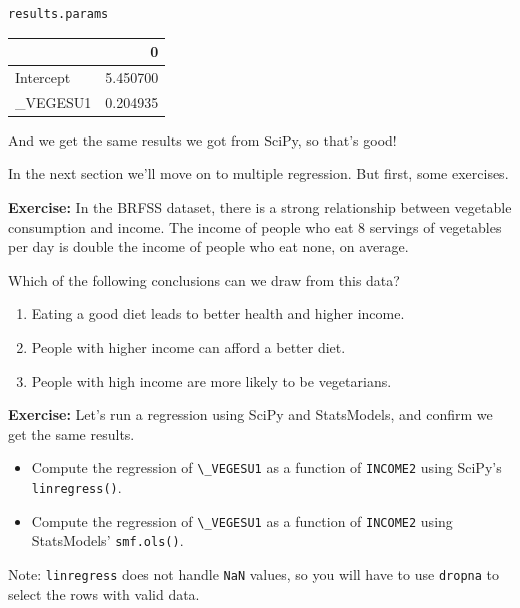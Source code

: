 \begin{lstlisting}[]
results.params
\end{lstlisting}

\begin{tabular}{lr}
\midrule
{} &         0 \\
\midrule
Intercept &  5.450700 \\
\_VEGESU1  &  0.204935 \\
\midrule
\end{tabular}

And we get the same results we got from SciPy, so that's good!

In the next section we'll move on to multiple regression. But first,
some exercises.

\textbf{Exercise:} In the BRFSS dataset, there is a strong relationship
between vegetable consumption and income. The income of people who eat 8
servings of vegetables per day is double the income of people who eat
none, on average.

Which of the following conclusions can we draw from this data?

\begin{enumerate}
\def\labelenumi{\Alph{enumi}.}
\item
  Eating a good diet leads to better health and higher income.
\item
  People with higher income can afford a better diet.
\item
  People with high income are more likely to be vegetarians.
\end{enumerate}

\textbf{Exercise:} Let's run a regression using SciPy and StatsModels,
and confirm we get the same results.

\begin{itemize}
\item
  Compute the regression of \passthrough{\lstinline!\_VEGESU1!} as a
  function of \passthrough{\lstinline!INCOME2!} using SciPy's
  \passthrough{\lstinline!linregress()!}.
\item
  Compute the regression of \passthrough{\lstinline!\_VEGESU1!} as a
  function of \passthrough{\lstinline!INCOME2!} using StatsModels'
  \passthrough{\lstinline!smf.ols()!}.
\end{itemize}

Note: \passthrough{\lstinline!linregress!} does not handle
\passthrough{\lstinline!NaN!} values, so you will have to use
\passthrough{\lstinline!dropna!} to select the rows with valid data.

